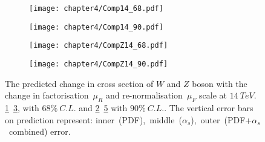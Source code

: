 \documentclass[a4paper,12pt]{report}
\numberwithin{equation}{section}
\begin{document}
\begin{figure}[H]
\centering
\begin{subfigure}{0.8\textwidth}
\texttt{[image: chapter4/Comp14\_68.pdf]}
\vspace*{-8mm}
\caption{}
\label{var_14-1}
\end{subfigure}
\begin{subfigure}{0.8\textwidth}
\texttt{[image: chapter4/Comp14\_90.pdf]}
\vspace*{-8mm}
\caption{}
\label{var_14-2}
\end{subfigure}
\begin{subfigure}{0.8\textwidth}
\texttt{[image: chapter4/CompZ14\_68.pdf]}
\vspace*{-8mm}
\caption{}
\label{var_14-3}
\end{subfigure}
\begin{subfigure}{0.8\textwidth}
\texttt{[image: chapter4/CompZ14\_90.pdf]}
\vspace*{-8mm}
\caption{}
\label{var_14-4}
\end{subfigure}
\caption{The predicted change in cross section of $W$ and $Z$ boson with the change in factorisation~$\mu_{R}$ and re-normalisation~$\mu_{F}$ scale at $14~TeV$. \ref{var_14-1}~\ref{var_14-3}, with $68\%~C.L.$ and \ref{var_14-2}~\ref{var_14-4} with $90\%~C.L.$. The vertical error bars on prediction represent: inner~(PDF),~middle~($\alpha_{s}$),~outer~(PDF+$\alpha_{s}$~combined) error.} 
\end{figure}
\end{document}
